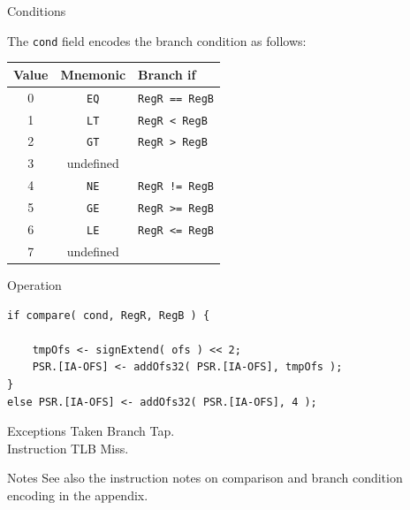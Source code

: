 \begin{iPageDescEntry}{Conditions}

The \texttt{cond} field encodes the branch condition as follows:

\begin{center}
\begin{tabular}{|c|c|l|}
\hline
\textbf{Value}  & \textbf{Mnemonic} & \textbf{Branch if} \\ \hline
0 & \texttt{EQ} & \texttt{RegR == RegB} \\ \hline
1 & \texttt{LT} & \texttt{RegR <  RegB} \\ \hline
2 & \texttt{GT} & \texttt{RegR >  RegB} \\ \hline
3 & undefined    & \\ \hline
4 & \texttt{NE} & \texttt{RegR != RegB} \\ \hline
5 & \texttt{GE} & \texttt{RegR >= RegB} \\ \hline
6 & \texttt{LE} & \texttt{RegR <=  RegB} \\ \hline
7 & undefined    & \\ \hline
\end{tabular}
\end{center}

\end{iPageDescEntry}

\begin{iPageDescOpEntry}{Operation}
\begin{lstlisting}[style=iPageOpStyle]
if compare( cond, RegR, RegB ) {

    tmpOfs <- signExtend( ofs ) << 2;
    PSR.[IA-OFS] <- addOfs32( PSR.[IA-OFS], tmpOfs );
}
else PSR.[IA-OFS] <- addOfs32( PSR.[IA-OFS], 4 );
\end{lstlisting}
\end{iPageDescOpEntry}

\begin{iPageDescEntry}{Exceptions}
	Taken Branch Tap.\\
	Instruction TLB Miss.
\end{iPageDescEntry}

\begin{iPageDescEntry}{Notes}{
See also the instruction notes on comparison and branch condition encoding in the appendix.
}
\end{iPageDescEntry}
